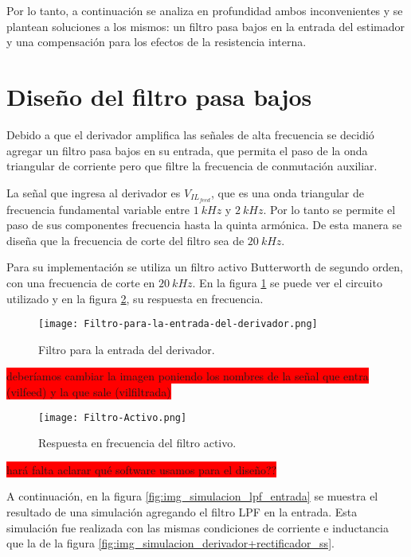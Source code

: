 Por lo tanto, a continuación se analiza en profundidad ambos inconvenientes y se plantean soluciones a los mismos: un filtro pasa bajos en la entrada del estimador y una compensación para los efectos de la resistencia interna.

\section{Diseño del filtro pasa bajos}

Debido a que el derivador amplifica las señales de alta frecuencia se decidió agregar un filtro pasa bajos en su entrada, que permita el paso de la onda triangular de corriente pero que filtre la frecuencia de conmutación auxiliar. 

La señal que ingresa al derivador es $V_{IL_{feed}}$, que es una onda triangular de frecuencia fundamental variable entre $1\:kHz$ y $2\:kHz$. Por lo tanto se permite el paso de sus componentes frecuencia hasta la quinta armónica. De esta manera se diseña que la frecuencia de corte del filtro sea de $20\:kHz$.

Para su implementación se utiliza un filtro activo Butterworth de segundo orden, con una frecuencia de corte en $20\:kHz$. En la figura  \ref{fig:img_Filtro-para-la-entrada-del-derivador} se puede ver el circuito utilizado y en la figura \ref{fig:img_Respuesta-en-frecuencia-del-filtro-activo}, su respuesta en frecuencia.

\begin{figure}[H]
	\centering
	\texttt{[image: Filtro-para-la-entrada-del-derivador.png]}
	\caption{Filtro para la entrada del derivador.}
	\label{fig:img_Filtro-para-la-entrada-del-derivador}
\end{figure}

\colorbox{red}{deberíamos cambiar la imagen poniendo los nombres de la señal que entra (vilfeed) y la que sale (vilfiltrada)}
\begin{figure}[H]
	\centering
	\texttt{[image: Filtro-Activo.png]}
	\caption{Respuesta en frecuencia del filtro activo.}
	\label{fig:img_Respuesta-en-frecuencia-del-filtro-activo}
\end{figure}

\colorbox{red}{hará falta aclarar qué software usamos para el diseño??}

A continuación, en la figura \ref{fig:img_simulacion_lpf_entrada} se muestra el resultado de una simulación agregando el filtro LPF en la entrada. Esta simulación fue realizada con las mismas condiciones de corriente e inductancia que la de la figura \ref{fig:img_simulacion_derivador+rectificador_ss}.

